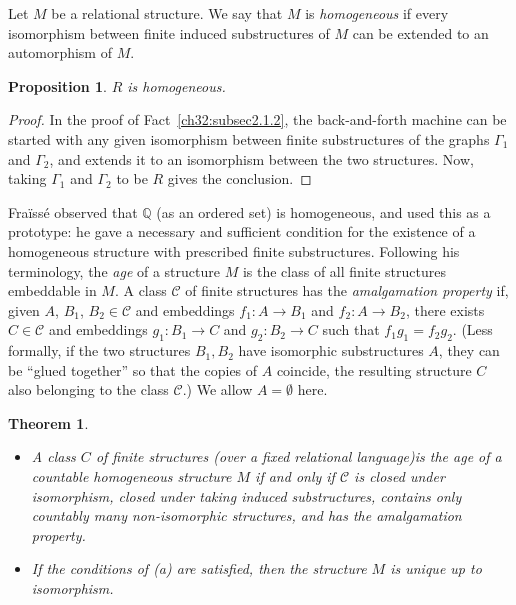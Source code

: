 \documentclass[12pt]{article}
\newtheorem{theorem}{Theorem}
\newtheorem{proposition}{Proposition}
\begin{document}
Let $M$ be a relational structure. We say that $M$ is
\emph{homogeneous} if every isomorphism between finite induced
substructures of $M$ can be extended to an automorphism of $M$.

\begin{proposition}\label{ch32:prop5.1} 
$R$ is homogeneous.
\end{proposition}
\begin{proof}
In the proof of Fact~\ref{ch32:subsec2.1.2}, the
back-and-forth machine can be started with any given isomorphism
between finite substructures of the graphs $\Gamma_1$ and
$\Gamma_2$, and extends it to an isomorphism between the two
structures. Now, taking $\Gamma_1$ and $\Gamma_2$ to be $R$ gives
the conclusion.
\end{proof}

Fra\"{i}ss\'{e} \cite{ch32:bib21} observed that $\mathbb{Q}$ (as an
ordered set) is homogeneous, and used this as a prototype: he gave a
necessary and sufficient condition for the existence of a
homogeneous structure with prescribed finite substructures.
Following his terminology, the \emph{age} of a structure $M$ is the
class of all finite structures embeddable in $M$. A class
$\mathcal{C}$ of finite structures has the \emph{amalgamation
property} if, given $A$, $B_1$, $B_2 \in \mathcal{C}$ and embeddings
$f_1 : A \rightarrow B_1$ and $f_2 : A \rightarrow B_2$, there
exists $C \in\mathcal{C}$ and embeddings $g_1 : B_1 \rightarrow C$
and $g_2 : B_2 \rightarrow C$ such that $f_1g_1 = f_2g_2$. (Less
formally, if the two structures $B_1, B_2$ have isomorphic
substructures $A$, they can be ``glued together'' so that the copies
of $A$ coincide, the resulting structure $C$ also belonging to the
class $\mathcal{C}$.) We allow $A=\emptyset$ here.

\begin{theorem}\label{ch32:them5.1} 
\begin{itemize}
\item[(a)] A class $C$ of finite structures (over a
fixed relational language)is the age of a countable homogeneous
structure $M$ if and only if $\mathcal{C}$ is closed under
isomorphism, closed under taking induced substructures, contains
only countably many non-isomorphic structures, and has the
amalgamation property.
\item[(b)] If the conditions of (a) are satisfied,
then the structure $M$ is unique up to isomorphism.
\end{itemize}
\end{theorem}
\end{document}
